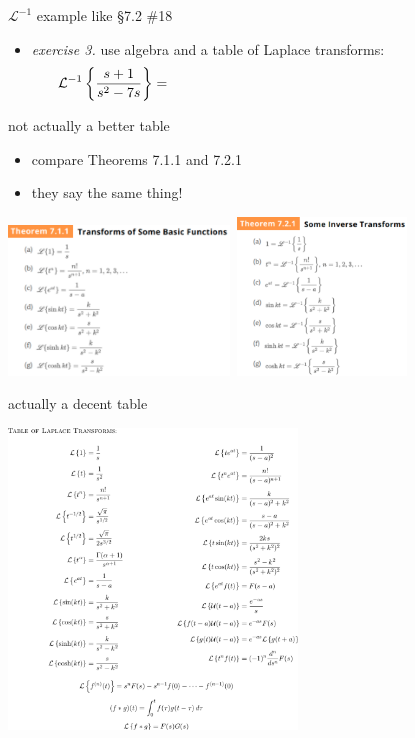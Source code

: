 \documentclass[dvipsnames,colorlinks]{beamer}
\begin{document}
\begin{frame}{$\mathcal{L}^{-1}$ example like \S7.2 \#18}

\begin{itemize}
\item \emph{exercise 3.}  use algebra and a table of Laplace transforms:
    $$\LLi{\frac{s+1}{s^2-7s}} = \hspace{80mm}$$
\end{itemize}

\vspace{50mm}
\end{frame}


\begin{frame}{not actually a better table}

\begin{itemize}
\item compare Theorems 7.1.1 and 7.2.1
\item they say the same thing!
\end{itemize}

\mbox{\includegraphics[height=40mm]{figs/laplacetable.pdf} \qquad \includegraphics[height=42mm]{figs/inverselaplacetable.pdf}}

\end{frame}


\begin{frame}{actually a decent table}

\vspace{-2mm}
\begin{center}
\includegraphics[height=80mm]{figs/fulllaplacetable}
\end{center}
\end{frame}
\end{document}

